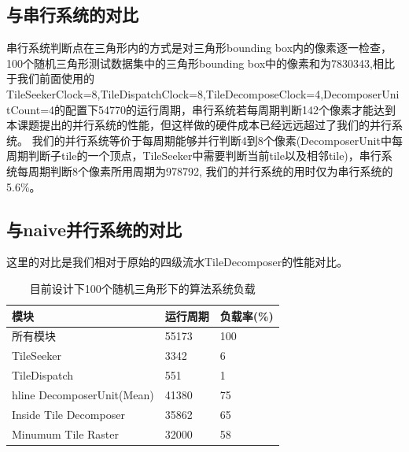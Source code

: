 \subsection{与串行系统的对比}

串行系统判断点在三角形内的方式是对三角形bounding box内的像素逐一检查，100个随机三角形测试数据集中的三角形bounding box中的像素和为7830343,相比于我们前面使用的TileSeekerClock=8,TileDispatchClock=8,TileDecomposeClock=4,DecomposerUnitCount=4的配置下54770的运行周期，串行系统若每周期判断142个像素才能达到本课题提出的并行系统的性能，但这样做的硬件成本已经远远超过了我们的并行系统。
我们的并行系统等价于每周期能够并行判断4到8个像素(DecomposerUnit中每周期判断子tile的一个顶点，TileSeeker中需要判断当前tile以及相邻tile)，串行系统每周期判断8个像素所用周期为978792, 我们的并行系统的用时仅为串行系统的5.6\%。

\subsection{与naive并行系统的对比}

这里的对比是我们相对于原始的四级流水TileDecomposer的性能对比。

\begin{table}
    \caption{\label{tab:current system}目前设计下100个随机三角形下的算法系统负载}

    \begin{tabularx}{\linewidth}{|XXX|}
        \hline
        模块 & 运行周期 & 负载率(\%) \\ \hline
        所有模块 & 55173 & 100 \\ \hline
        TileSeeker & 3342 & 6  \\ \hline
        TileDispatch & 551 & 1 \\ hline
        DecomposerUnit(Mean) & 41380 & 75  \\ \hline
        Inside Tile Decomposer & 35862 & 65 \\ \hline
        Minumum Tile Raster & 32000 & 58 \\ \hline
    \end{tabularx}
\end{table}


